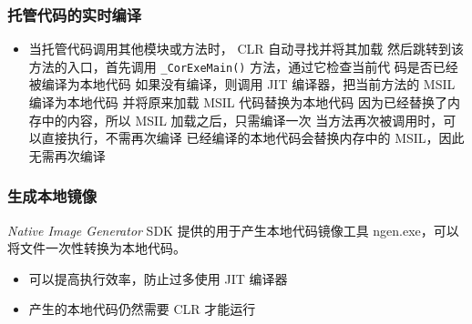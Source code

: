 \begin{frame}
\frametitle{托管代码的实时编译}
\begin{overlayarea}{\textwidth}{1.2cm}
  \begin{itemize}
  \item \small
     {当托管代码调用其他模块或方法时， CLR 自动寻找并将其加载}
     {然后跳转到该方法的入口，首先调用 \texttt{\_CorExeMain()} 方法，通过它检查当前代
      码是否已经被编译为本地代码}
     {如果没有编译，则调用 JIT 编译器，把当前方法的 MSIL 编译为本地代码}
     {并将原来加载 MSIL 代码替换为本地代码}
     {因为已经替换了内存中的内容，所以 MSIL 加载之后，只需编译一次 }
     {当方法再次被调用时，可以直接执行，不需再次编译}
     {已经编译的本地代码会替换内存中的 MSIL，因此无需再次编译}
  \end{itemize}
\end{overlayarea}

\begin{figure}[h] 
  \centering 
\end{figure}

\end{frame}

\begin{frame}
\frametitle{生成本地镜像}
\begin{block}{\textit{Native Image Generator}}
  \CJKindent \small SDK 提供的用于产生本地代码镜像工具 ngen.exe，可以将文件一次性转换为本地代码。
\end{block}
\vskip4pt
\vskip4pt
\begin{itemize}
\item 可以提高执行效率，防止过多使用 JIT 编译器
\item 产生的本地代码仍然需要 CLR 才能运行
\end{itemize}

\end{frame}

